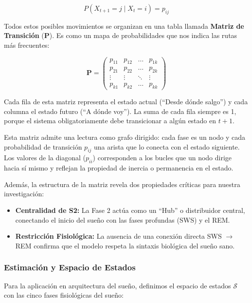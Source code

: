 \begin{equation}
    P(X_{t+1} = j \mid X_t = i) = p_{ij}
\end{equation}

Todos estos posibles movimientos se organizan en una tabla llamada \textbf{Matriz de Transición} ($\mathbf{P}$). Es como un mapa de probabilidades que nos indica las rutas más frecuentes:

\begin{equation}
    \mathbf{P} = \begin{pmatrix}
    p_{11} & p_{12} & \dots & p_{1k} \\
    p_{21} & p_{22} & \dots & p_{2k} \\
    \vdots & \vdots & \ddots & \vdots \\
    p_{k1} & p_{k2} & \dots & p_{kk}
    \end{pmatrix}
\end{equation}

Cada fila de esta matriz representa el estado actual (``Desde dónde salgo'') y cada columna el estado futuro (``A dónde voy''). La suma de cada fila siempre es 1, porque el sistema obligatoriamente debe transicionar a algún estado en $t+1$.

Esta matriz admite una lectura como grafo dirigido: cada fase es un nodo y cada probabilidad de transición $p_{ij}$ una arista que lo conecta con el estado siguiente. Los valores de la diagonal ($p_{ii}$) corresponden a los bucles que un nodo dirige hacia sí mismo y reflejan la propiedad de inercia o permanencia en el estado.

Además, la estructura de la matriz revela dos propiedades críticas para nuestra investigación:
\begin{itemize}
    \item \textbf{Centralidad de S2:} La Fase 2 actúa como un ``Hub'' o distribuidor central, conectando el inicio del sueño con las fases profundas (SWS) y el REM.
    \item \textbf{Restricción Fisiológica:} La ausencia de una conexión directa SWS $\to$ REM confirma que el modelo respeta la sintaxis biológica del sueño sano.
\end{itemize}

\subsubsection{Estimación y Espacio de Estados}

Para la aplicación en arquitectura del sueño, definimos el espacio de estados $\mathcal{S}$ con las cinco fases fisiológicas del sueño:

